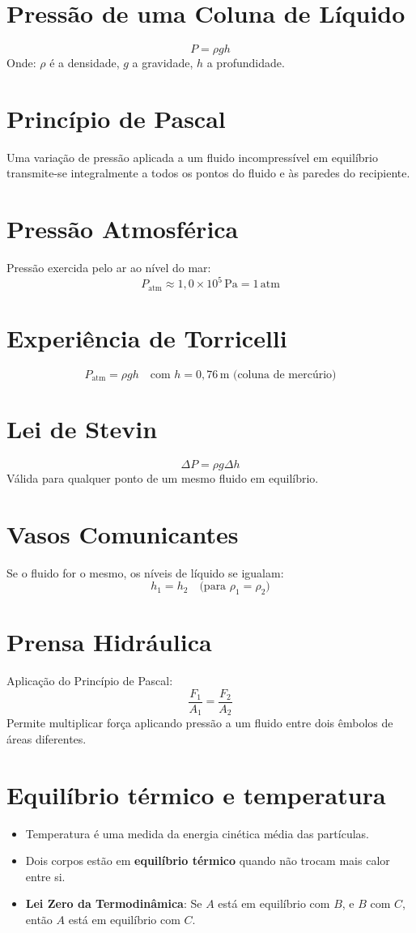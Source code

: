 \documentclass[a4paper,12pt]{article}
\begin{document}
\begin{multicols}{2}
\section{Pressão de uma Coluna de Líquido}
\[
P = \rho g h
\]
Onde: \(\rho\) é a densidade, \(g\) a gravidade, \(h\) a profundidade.

\section{Princípio de Pascal}
Uma variação de pressão aplicada a um fluido incompressível em equilíbrio transmite-se integralmente a todos os pontos do fluido e às paredes do recipiente.

\section{Pressão Atmosférica}
Pressão exercida pelo ar ao nível do mar:
\[
P_{\text{atm}} \approx 1{,}0 \times 10^5\, \text{Pa} = 1\, \text{atm}
\]

\section{Experiência de Torricelli}
\[
P_{\text{atm}} = \rho g h \quad \text{com } h = 0{,}76\, \text{m (coluna de mercúrio)}
\]

\section{Lei de Stevin}
\[
\Delta P = \rho g \Delta h
\]
Válida para qualquer ponto de um mesmo fluido em equilíbrio.

\section{Vasos Comunicantes}
Se o fluido for o mesmo, os níveis de líquido se igualam:
\[
h_1 = h_2
\quad \text{(para } \rho_1 = \rho_2)
\]

\section{Prensa Hidráulica}
Aplicação do Princípio de Pascal:
\[
\frac{F_1}{A_1} = \frac{F_2}{A_2}
\]
Permite multiplicar força aplicando pressão a um fluido entre dois êmbolos de áreas diferentes.

\section{Equilíbrio térmico e temperatura}
\begin{itemize}
    \item Temperatura é uma medida da energia cinética média das partículas.
    \item Dois corpos estão em \textbf{equilíbrio térmico} quando não trocam mais calor entre si.
    \item \textbf{Lei Zero da Termodinâmica}: Se $A$ está em equilíbrio com $B$, e $B$ com $C$, então $A$ está em equilíbrio com $C$.
\end{itemize}


\end{multicols}
\end{document}
